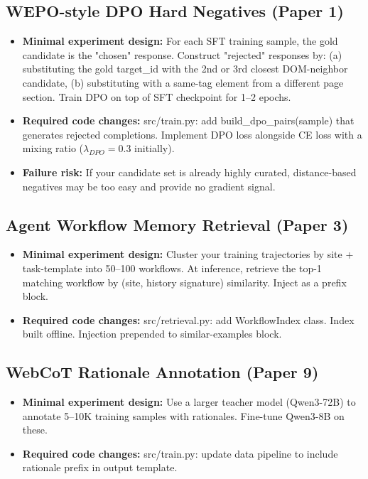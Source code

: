 \documentclass[pdflatex,sn-mathphys-num]{sn-jnl}
\theoremstyle{thmstyleone}
\theoremstyle{thmstyletwo}
\theoremstyle{thmstylethree}
\begin{document}
\subsection{WEPO-style DPO Hard Negatives (Paper 1)}
\begin{itemize}
\item \textbf{Minimal experiment design:} For each SFT training sample, the gold candidate is the "chosen" response. Construct "rejected" responses by: (a) substituting the gold target\_id with the 2nd or 3rd closest DOM-neighbor candidate, (b) substituting with a same-tag element from a different page section. Train DPO on top of SFT checkpoint for 1--2 epochs.
\item \textbf{Required code changes:} src/train.py: add build\_dpo\_pairs(sample) that generates rejected completions. Implement DPO loss alongside CE loss with a mixing ratio ($\lambda_{DPO} = 0.3$ initially).
\item \textbf{Failure risk:} If your candidate set is already highly curated, distance-based negatives may be too easy and provide no gradient signal.
\end{itemize}

\subsection{Agent Workflow Memory Retrieval (Paper 3)}
\begin{itemize}
\item \textbf{Minimal experiment design:} Cluster your training trajectories by site + task-template into 50--100 workflows. At inference, retrieve the top-1 matching workflow by (site, history signature) similarity. Inject as a prefix block.
\item \textbf{Required code changes:} src/retrieval.py: add WorkflowIndex class. Index built offline. Injection prepended to similar-examples block.
\end{itemize}

\subsection{WebCoT Rationale Annotation (Paper 9)}
\begin{itemize}
\item \textbf{Minimal experiment design:} Use a larger teacher model (Qwen3-72B) to annotate 5--10K training samples with rationales. Fine-tune Qwen3-8B on these.
\item \textbf{Required code changes:} src/train.py: update data pipeline to include rationale prefix in output template.
\end{itemize}
\end{document}
